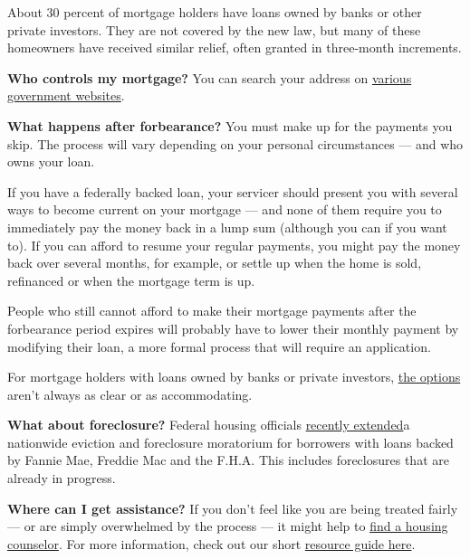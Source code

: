 About 30 percent of mortgage holders have loans owned by banks or other
private investors. They are not covered by the new law, but many of
these homeowners have received similar relief, often granted in
three-month increments.

\textbf{Who controls my mortgage?} You can search your address on
\href{https://www.consumerfinance.gov/ask-cfpb/how-can-i-tell-who-owns-my-mortgage-en-214/}{various}
\href{https://www.makinghomeaffordable.gov/get-answers/Pages/get-answers-find-out-mortgage.aspx}{government
websites}.

\textbf{What happens after forbearance?} You must make up for the
payments you skip. The process will vary depending on your personal
circumstances --- and who owns your loan.

If you have a federally backed loan, your servicer should present you
with several ways to become current on your mortgage --- and none of
them require you to immediately pay the money back in a lump sum
(although you can if you want to). If you can afford to resume your
regular payments, you might pay the money back over several months, for
example, or settle up when the home is sold, refinanced or when the
mortgage term is up.

People who still cannot afford to make their mortgage payments after the
forbearance period expires will probably have to lower their monthly
payment by modifying their loan, a more formal process that will require
an application.

For mortgage holders with loans owned by banks or private investors,
\href{https://www.nytimes3xbfgragh.onion/2020/05/15/business/coronavirus-mortgage-relief.html}{the
options} aren't always as clear or as accommodating.

\textbf{What about foreclosure?} Federal housing officials
\href{https://www.fhfa.gov/Media/PublicAffairs/Pages/FHFA-Extends-Foreclosure-and-Eviction-Moratorium-6172020.aspx}{recently
extended}a nationwide eviction and foreclosure moratorium for borrowers
with loans backed by Fannie Mae, Freddie Mac and the F.H.A. This
includes foreclosures that are already in progress.

\textbf{Where can I get assistance?} If you don't feel like you are
being treated fairly --- or are simply overwhelmed by the process --- it
might help to
\href{https://apps.hud.gov/offices/hsg/sfh/hcc/hcs.cfm}{find a housing
counselor}. For more information, check out our short
\href{https://www.nytimes3xbfgragh.onion/2020/05/15/business/covid-mortgage-forbearance.html}{resource
guide here}.

